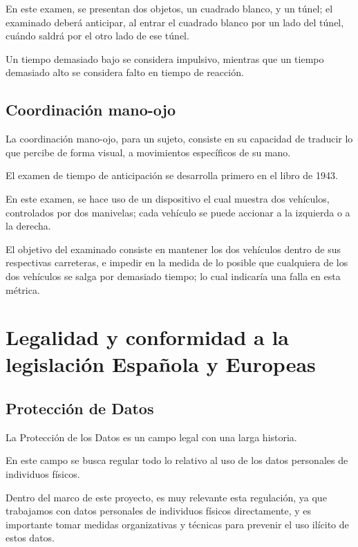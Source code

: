 \documentclass[12pt,a4paper,twoside,openright]{book}
\begin{document}
En este examen, se presentan dos objetos, un cuadrado blanco, y un túnel; el examinado deberá anticipar, al entrar el cuadrado blanco por un lado del túnel, cuándo saldrá por el otro lado de ese túnel.

Un tiempo demasiado bajo se considera impulsivo, mientras que un tiempo demasiado alto se considera falto en tiempo de reacción.

\subsection{Coordinación mano-ojo}

La coordinación mano-ojo, para un sujeto, consiste en su capacidad de traducir lo que percibe de forma visual, a movimientos específicos de su mano.

El examen de tiempo de anticipación se desarrolla primero en el libro de 1943. \cite{bonnardel1943adaptation}

En este examen, se hace uso de un dispositivo el cual muestra dos vehículos, controlados por dos manivelas; cada vehículo se puede accionar a la izquierda o a la derecha.

El objetivo del examinado consiste en mantener los dos vehículos dentro de sus respectivas carreteras, e impedir en la medida de lo posible que cualquiera de los dos vehículos se salga por demasiado tiempo; lo cual indicaría una falla en esta métrica.

\section{Legalidad y conformidad a la legislación Española y Europeas}

\subsection{Protección de Datos}

La Protección de los Datos es un campo legal con una larga historia. \cite{apuntesprotecciondatos}

En este campo se busca regular todo lo relativo al uso de los datos personales de individuos físicos. \cite{apuntesprotecciondatos}

Dentro del marco de este proyecto, es muy relevante esta regulación, ya que trabajamos con datos personales de individuos físicos directamente, y es importante tomar medidas organizativas y técnicas para prevenir el uso ilícito de estos datos. \cite{apuntesprotecciondatos}
\end{document}
